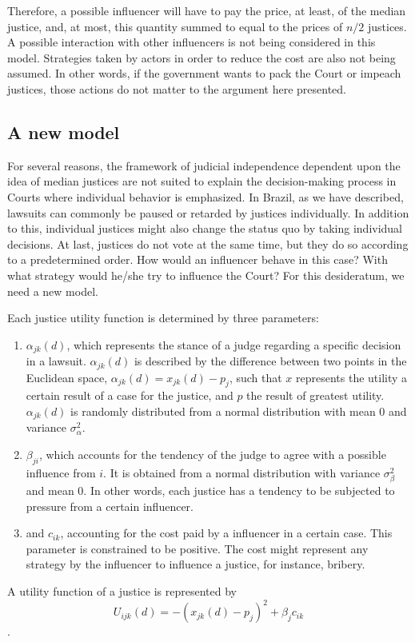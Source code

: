 \documentclass[12pt, a4paper]{article}
\begin{document}
Therefore, a possible influencer will have to pay the price, at least,
of the median justice, and, at most, this quantity summed to
equal to the prices of $n/2$ justices. A possible
interaction with other influencers is not being considered in this model.
Strategies taken by actors in order to reduce the cost are also not being
assumed. In other words, if the government wants to pack the Court or
impeach justices, those actions do not matter to the argument here presented.






\subsection{A new model}


For several reasons, the framework of judicial independence 
dependent upon the idea of median justices are not suited to 
explain the decision-making process in Courts where individual 
behavior is emphasized. In Brazil, as we have described, 
lawsuits can commonly be paused or retarded by justices individually. 
In addition to this, individual justices might also change the status quo 
by taking individual decisions. At last, justices do not vote at 
the same time, but they do so according to a predetermined order. 
How would an influencer behave in this case? With what strategy 
would he/she try to influence the Court? For this desideratum, 
we need a new model. 


Each justice utility function is determined by three parameters: \begin{enumerate} \item $\alpha_{jk}(d)$, which represents the stance of a judge regarding a specific decision in a lawsuit. $\alpha_{jk}(d)$ is described by the difference between two points in the Euclidean space, $\alpha_{jk}(d) = x_{jk}(d) - p_{j}$, such that $x$ represents the utility a certain result of a case for the justice, and $p$ the result of greatest utility. $\alpha_{jk}(d)$ is randomly distributed from a normal distribution with mean 0 and variance $\sigma_{\alpha}^2$. \item $\beta_{ji}$, which accounts for the tendency of the judge to agree with a possible influence from $i$. It is obtained from a normal distribution with variance $\sigma_{\beta}^2$ and mean 0. In other words, each justice has a tendency to be subjected to pressure from a certain influencer. \item and $c_{ik}$, accounting for the cost paid by a influencer in a certain case. This parameter is constrained to be positive. The cost might represent any strategy by the influencer to influence a justice, for instance, bribery.  \end{enumerate}  A utility function of a justice is represented by \begin{equation} U_{ijk}(d) = -(x_{jk}(d) - p_{j})^2  + \beta_j c_{ik} \end{equation}.  
\end{document}
